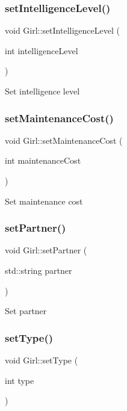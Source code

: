 \subsubsection{\texorpdfstring{set\+Intelligence\+Level()}{setIntelligenceLevel()}}
{\footnotesize\ttfamily void Girl\+::set\+Intelligence\+Level (\begin{DoxyParamCaption}\item[{int}]{intelligence\+Level }\end{DoxyParamCaption})}

Set intelligence level \mbox{\label{class_girl_a585d7b2bbaec1d608e64fd29138e4632}} 
\subsubsection{\texorpdfstring{set\+Maintenance\+Cost()}{setMaintenanceCost()}}
{\footnotesize\ttfamily void Girl\+::set\+Maintenance\+Cost (\begin{DoxyParamCaption}\item[{int}]{maintenance\+Cost }\end{DoxyParamCaption})}

Set maintenance cost \mbox{\label{class_girl_a4f75b05e9d1362c27053248521e118be}} 
\subsubsection{\texorpdfstring{set\+Partner()}{setPartner()}}
{\footnotesize\ttfamily void Girl\+::set\+Partner (\begin{DoxyParamCaption}\item[{std\+::string}]{partner }\end{DoxyParamCaption})}

Set partner \mbox{\label{class_girl_ac83625dfc5d32ef2ea53714613926c49}} 
\subsubsection{\texorpdfstring{set\+Type()}{setType()}}
{\footnotesize\ttfamily void Girl\+::set\+Type (\begin{DoxyParamCaption}\item[{int}]{type }\end{DoxyParamCaption})}

